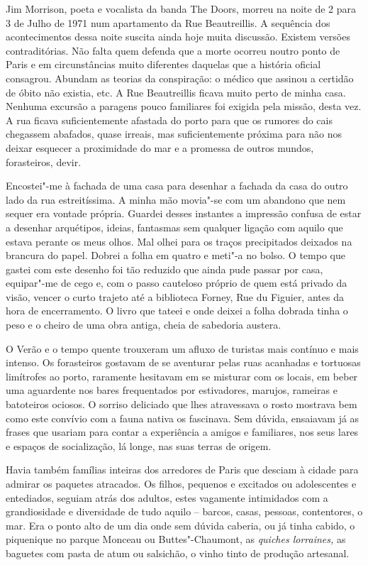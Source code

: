 Jim Morrison, poeta e vocalista da banda The Doors, morreu na noite de
2 para 3 de Julho de 1971 num apartamento da Rue Beautreillis. A
sequência dos acontecimentos dessa noite suscita ainda hoje muita
discussão. Existem versões contraditórias. Não falta quem defenda que
a morte ocorreu noutro ponto de Paris e em circunstâncias muito
diferentes daquelas que a história oficial consagrou. Abundam as teorias
da conspiração: o médico que assinou a certidão de óbito não existia, etc. A Rue Beautreillis ficava muito perto de minha casa. Nenhuma
excursão a paragens pouco familiares foi exigida pela missão, desta vez.
A rua ficava suficientemente afastada do porto para que os rumores do
cais chegassem abafados, quase irreais, mas suficientemente próxima para
não nos deixar esquecer a proximidade do mar e a promessa de outros
mundos, forasteiros, devir.

Encostei"-me à fachada de uma casa para desenhar a fachada da casa do
outro lado da rua estreitíssima. A minha mão movia"-se com um abandono
que nem sequer era vontade própria. Guardei desses instantes a impressão
confusa de estar a desenhar arquétipos, ideias, fantasmas sem qualquer
ligação com aquilo que estava perante os meus olhos. Mal olhei para os
traços precipitados deixados na brancura do papel. Dobrei a folha em
quatro e meti"-a no bolso. O tempo que gastei com este desenho foi tão
reduzido que ainda pude passar por casa, equipar"-me de cego e, com o
passo cauteloso próprio de quem está privado da visão, vencer o curto
trajeto até a biblioteca Forney, Rue du Figuier, antes da hora de
encerramento. O livro que tateei e onde deixei a folha dobrada tinha o
peso e o cheiro de uma obra antiga, cheia de sabedoria austera.



O Verão e o tempo quente trouxeram um afluxo de turistas mais contínuo
e mais intenso. Os forasteiros gostavam de se aventurar pelas ruas
acanhadas e tortuosas limítrofes ao porto, raramente hesitavam em se
misturar com os locais, em beber uma aguardente nos bares frequentados
por estivadores, marujos, rameiras e batoteiros ociosos. O sorriso
deliciado que lhes atravessava o rosto mostrava bem como este convívio
com a fauna nativa os fascinava. Sem dúvida, ensaiavam já as frases que
usariam para contar a experiência a amigos e familiares, nos seus lares
e espaços de socialização, lá longe, nas suas terras de origem.

Havia também famílias inteiras dos arredores de Paris que desciam à
cidade para admirar os paquetes atracados. Os filhos, pequenos e
excitados ou adolescentes e entediados, seguiam atrás dos adultos, estes
vagamente intimidados com a grandiosidade e diversidade de tudo aquilo
-- barcos, casas, pessoas, contentores, o mar. Era o ponto alto de um
dia onde sem dúvida caberia, ou já tinha cabido, o piquenique no parque
Monceau ou Buttes"-Chaumont, as \emph{quiches lorraines, }as baguetes com
pasta de atum ou salsichão, o vinho tinto de produção artesanal.

